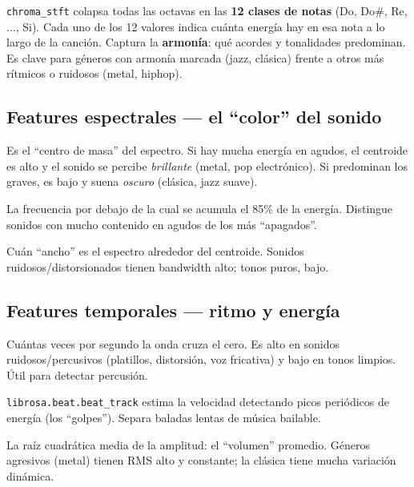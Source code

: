 \documentclass[11pt,a4paper]{article}
\begin{document}
\texttt{chroma\_stft} colapsa todas las octavas en las \textbf{12 clases de
notas} (Do, Do\#, Re, ..., Si). Cada uno de los 12 valores indica cuánta energía
hay en esa nota a lo largo de la canción. Captura la \textbf{armonía}: qué
acordes y tonalidades predominan. Es clave para géneros con armonía marcada
(jazz, clásica) frente a otros más rítmicos o ruidosos (metal, hiphop).

\subsection{Features espectrales --- el ``color'' del sonido}

\begin{description}[leftmargin=0.5cm,style=nextline]
  \item[Spectral Centroid (brillo)] Es el ``centro de masa'' del espectro. Si
  hay mucha energía en agudos, el centroide es alto y el sonido se percibe
  \emph{brillante} (metal, pop electrónico). Si predominan los graves, es bajo y
  suena \emph{oscuro} (clásica, jazz suave).
  \item[Spectral Rolloff] La frecuencia por debajo de la cual se acumula el 85\%
  de la energía. Distingue sonidos con mucho contenido en agudos de los más
  ``apagados''.
  \item[Spectral Bandwidth] Cuán ``ancho'' es el espectro alrededor del
  centroide. Sonidos ruidosos/distorsionados tienen bandwidth alto; tonos puros,
  bajo.
\end{description}

\subsection{Features temporales --- ritmo y energía}

\begin{description}[leftmargin=0.5cm,style=nextline]
  \item[Zero Crossing Rate (ZCR)] Cuántas veces por segundo la onda cruza el
  cero. Es alto en sonidos ruidosos/percusivos (platillos, distorsión, voz
  fricativa) y bajo en tonos limpios. Útil para detectar percusión.
  \item[Tempo (BPM)] \texttt{librosa.beat.beat\_track} estima la velocidad
  detectando picos periódicos de energía (los ``golpes''). Separa baladas lentas
  de música bailable.
  \item[RMS Energy] La raíz cuadrática media de la amplitud: el ``volumen''
  promedio. Géneros agresivos (metal) tienen RMS alto y constante; la clásica
  tiene mucha variación dinámica.
\end{description}
\end{document}
